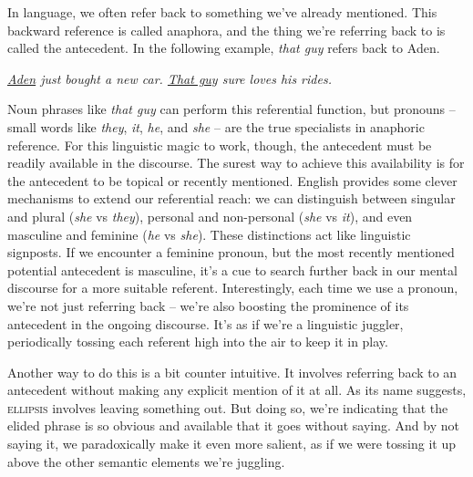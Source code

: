 In language, we often refer back to something we've already mentioned. This backward reference is called anaphora, and the thing we're referring back to is called the antecedent. In the following example, \textit{that guy} refers back to Aden. 

\ea \textit{\uline{Aden} just bought a new car. \uline{That guy} sure loves his rides.}\\
    \label{ex:Aden1}
\z

Noun phrases like \textit{that guy} can perform this referential function, but pronouns -- small words like \textit{they}, \textit{it}, \textit{he}, and \textit{she} -- are the true specialists in anaphoric reference. For this linguistic magic to work, though, the antecedent must be readily available in the discourse. The surest way to achieve this availability is for the antecedent to be topical or recently mentioned. English provides some clever mechanisms to extend our referential reach: we can distinguish between singular and plural (\textit{she} vs \textit{they}), personal and non-personal (\textit{she} vs \textit{it}), and even masculine and feminine (\textit{he} vs \textit{she}). These distinctions act like linguistic signposts. If we encounter a feminine pronoun, but the most recently mentioned potential antecedent is masculine, it's a cue to search further back in our mental discourse for a more suitable referent. Interestingly, each time we use a pronoun, we're not just referring back -- we're also boosting the prominence of its antecedent in the ongoing discourse. It's as if we're a linguistic juggler, periodically tossing each referent high into the air to keep it in play.

Another way to do this is a bit counter intuitive. It involves referring back to an antecedent without making any explicit mention of it at all. As its name suggests, \textsc{ellipsis} involves leaving something out. But doing so, we're indicating that the elided phrase is so obvious and available that it goes without saying. And by not saying it, we paradoxically make it even more salient, as if we were tossing it up above the other semantic elements we're juggling.

